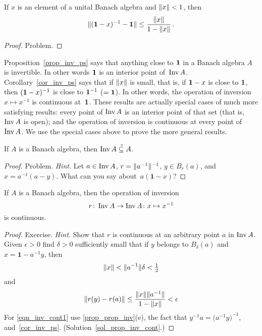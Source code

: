 \begin{cor}\label{cor_inv_ps}  If $x$ is an element of a unital Banach algebra and
$\lVert x\rVert < 1$, then
  \[ \lVert(\boldsymbol 1-x)^{-1} - \boldsymbol 1\rVert \le \frac{\lVert x\rVert}{1 - \lVert x\rVert}\,. \]
\end{cor}

\begin{proof} Problem.   \ns  \end{proof}

Proposition~\ref{prop_inv_ps} says that anything close to $\mathbf{1}$ in a Banach algebra $A$ is
invertible.  In other words $\mathbf{1}$ is an interior point of~$\operatorname{Inv} A$.
Corollary~\ref{cor_inv_ps} says that if $\lVert x\rVert$ is small, that is, if $\mathbf{1} - x$ is close
to $\mathbf{1}$, then $(\mathbf{1} - x)^{-1}$ is close to $\mathbf{1}^{-1}$ ($= \mathbf{1}$). In other words, the
operation of inversion $x \mapsto x^{-1}$ is continuous at~$\mathbf{1}$. These results are actually
special cases of much more satisfying results: every point of $\operatorname{Inv} A$ is an interior point of
that set (that is, $\operatorname{Inv} A$ is open); and the operation of inversion is continuous at every
point of $\operatorname{Inv} A$.  We use the special cases above to prove the more general results.

\begin{prop}  If $A$ is a Banach algebra, then $\operatorname{Inv} A\overset{\thickspace{}_\circ}{\subseteq}A$.
\end{prop}

\begin{proof} Problem.  \emph{Hint.}  Let $a \in \operatorname{Inv} A$, $r = \lVert a^{-1}\rVert^{-1}$, $y \in
B_r(a)$, and $x = a^{-1}(a - y)$.  What can you say about~$a(\boldsymbol 1 - x)$?  \ns
\end{proof}

\begin{prop}\label{prop_inv_cont} If $A$ is a Banach algebra, then the operation of inversion
  \[ r \colon \operatorname{Inv} A \rightarrow \operatorname{Inv} A \colon  x \mapsto x^{-1} \]
is continuous.
\end{prop}

\begin{proof} Exercise.  \emph{Hint.}  Show that $r$ is continuous at an arbitrary point $a$ in
$\operatorname{Inv} A$.  Given $\epsilon > 0$ find $\delta > 0$ sufficiently small that if $y$ belongs to
$B_{\delta}(a)$ and $x = \boldsymbol 1 - a^{-1}y$, then
  \[ \lVert x\rVert < \lVert a^{-1}\rVert\delta < \tfrac12 \]
and
  \begin{equation}\label{eqn_inv_cont1}
     \lVert r(y) - r(a)\rVert \le \frac{\lVert x\rVert \lVert a^{-1}\rVert}{1 - \lVert x\rVert} < \epsilon
  \end{equation}
For \eqref{eqn_inv_cont1} use \ref{prop_prop_inv}(e), the fact that $y^{-1}a =
\bigl(a^{-1}y\bigr)^{-1}$, and~\ref{cor_inv_ps}.  (Solution~\ref{sol_prop_inv_cont}.) \ns
\end{proof}

